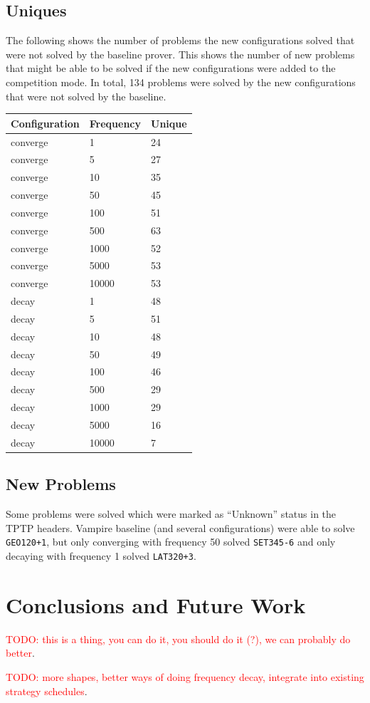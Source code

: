 \documentclass{llncs}
\newcommand{\todo}[1]{\textcolor{red}{TODO: #1}}
\begin{document}
\subsection{Uniques}
The following shows the number of problems the new configurations solved that were not solved by the baseline prover.
This shows the number of new problems that might be able to be solved if the new configurations were added to the competition mode.
In total, 134 problems were solved by the new configurations that were not solved by the baseline.

\begin{center}
\begin{tabular}{l l l}
	Configuration & Frequency & Unique\\
	\hline
	converge & 1 & 24\\
	converge & 5 & 27\\
	converge & 10 & 35\\
	converge & 50 & 45\\
	converge & 100 & 51\\
	converge & 500 & 63\\
	converge & 1000 & 52\\
	converge & 5000 & 53\\
	converge & 10000 & 53\\
	\hline
	decay & 1 & 48\\
	decay & 5 & 51\\
	decay & 10 & 48\\
	decay & 50 & 49\\
	decay & 100 & 46\\
	decay & 500 & 29\\
	decay & 1000 & 29\\
	decay & 5000 & 16\\
	decay & 10000 & 7\\
\end{tabular}
\end{center}

\subsection{New Problems}
Some problems were solved which were marked as ``Unknown'' status in the TPTP headers.
Vampire baseline (and several configurations) were able to solve \texttt{GEO120+1}, but only converging with frequency 50 solved \texttt{SET345-6} and only decaying with frequency 1 solved \texttt{LAT320+3}.


\section{Conclusions and Future Work}
\label{sec:conclusions}

\todo{this is a thing, you can do it, you should do it (?), we can probably do better}.

\todo{more shapes, better ways of doing frequency decay, integrate into existing strategy schedules}.



\end{document}
